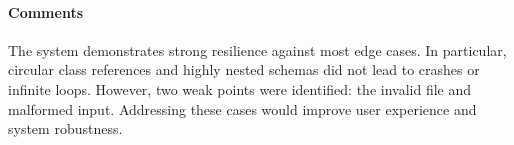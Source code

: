 \paragraph{Comments}
The system demonstrates strong resilience against most edge cases. In particular, circular class references and highly nested schemas did not lead to crashes or infinite loops. However, two weak points were identified: the invalid file and malformed input.
Addressing these cases would improve user experience and system robustness.